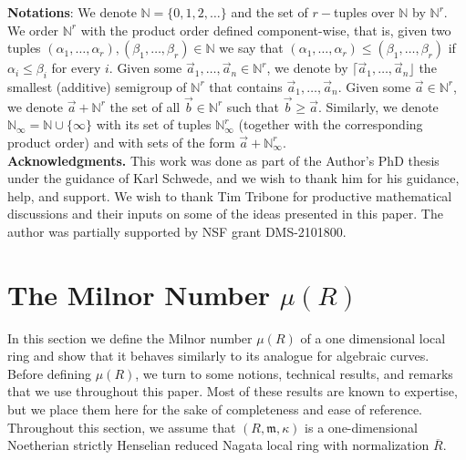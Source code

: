 \documentclass{article}
\numberwithin{theorem}{section}
\begin{document}
\noindent\textbf{Notations}: We denote $\mathbb{N}=\{0,1,2, \dots\}$ and the set of $r-$tuples over $\mathbb{N}$ by $\mathbb{N}^r$. We order $\mathbb{N}^r$ with the product order defined component-wise, that is, given two tuples $(\alpha_1, \dots, \alpha_r),(\beta_1, \dots, \beta_r) \in \mathbb{N}$ we say that $(\alpha_1, \dots, \alpha_r) \leq (\beta_1, \dots, \beta_r)$ if $\alpha_i \leq \beta_i$ for every $i$. Given some $\vec{a}_1, \dots, \vec{a}_n \in \mathbb{N}^r$, we denote by $\lceil \vec{a}_1, \dots, \vec{a}_n \rfloor$ the smallest (additive) semigroup of $\mathbb{N}^r$ that contains $\vec{a}_1, \dots, \vec{a}_n$. Given some $\vec{a} \in \mathbb{N}^r$, we denote $\vec{a} + \mathbb{N}^{r}$ the set of all $\vec{b} \in \mathbb{N}^r$ such that $\vec{b} \geq \vec{a}$. Similarly, we denote $\mathbb{N}_\infty = \mathbb{N} \cup \{\infty\}$ with its set of tuples $\mathbb{N}_\infty^r$ (together with the corresponding product order) and with sets of the form $\vec{a} + \mathbb{N}^r_\infty$.   \\

  

\noindent\textbf{Acknowledgments.} This work was done as part of the Author's PhD thesis under the guidance of Karl Schwede, and we wish to thank him for his guidance, help, and support. We wish to thank Tim Tribone for productive mathematical discussions and their inputs on some of the ideas presented in this paper. The author was partially supported by NSF grant DMS-2101800. 

\section{The Milnor Number $\mu(R)$}\label{sec:milnor}

In this section we define the Milnor number $\mu(R)$ of a one dimensional local ring and show that it behaves similarly to its analogue for algebraic curves. Before defining $\mu(R)$, we turn to some notions,  technical results, and remarks that we use throughout this paper. Most of these results are known to expertise, but we place them here for the sake of completeness and ease of reference.\\

Throughout this section, we assume that $(R, \mathfrak{m}, \kappa)$ is a one-dimensional Noetherian strictly Henselian reduced Nagata local ring with normalization $\overline{R}$. 
\end{document}
